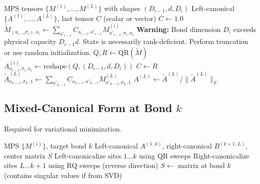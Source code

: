 \documentclass[aps,prb,onecolumn,scriptaddress]{revtex4-2}
\begin{document}
	\begin{algorithm}[H]
		\caption{LeftCanonicalize (Numerically Stable)}
		\begin{algorithmic}[1]
			\Require MPS tensors $\{M^{(1)}, \dots, M^{(L)}\}$ with shapes $(D_{i-1}, d, D_i)$
			\Ensure Left-canonical $\{A^{(1)}, \dots, A^{(L)}\}$, last tensor $C$ (scalar or vector)
			\State $C \gets 1.0$ 
			\State {}
			\State $\tilde{M}_{(a_{i-1}\sigma_i), a_i} \gets \sum_{a'_{i-1}} C_{a_{i-1}, a'_{i-1}} M^{(i)}_{a'_{i-1}, \sigma_i, a_i}$ 
			\State {}
			\State {}
			\State {}
			\State \textbf{Warning:} Bond dimension $D_i$ exceeds physical capacity $D_{i-1}d$. 
			\State {} State is necessarily rank-deficient. Perform truncation or use random initialization.
			\EndIf
			\State $Q, R \gets \text{QR}(\tilde{M})$ 
			\State $A^{(i)}_{a_{i-1}, \sigma_i, a_i} \gets \text{reshape}(Q, (D_{i-1}, d, D_i))$
			\State $C \gets R$ 
			\EndFor
			\State {}
			\State $\tilde{A}^{(L)}_{a_{L-1}, \sigma_L, 1} \gets \sum_{a'_{L-1}} C_{a_{L-1}, a'_{L-1}} M^{(L)}_{a'_{L-1}, \sigma_L, 1}$ 
			\State $A^{(L)} \gets \tilde{A}^{(L)} / \|\tilde{A}^{(L)}\|_F$ 
		\end{algorithmic}
	\end{algorithm}
	
	
	\subsection{Mixed-Canonical Form at Bond $k$}
	Required for variational minimization.
	
	\begin{algorithm}[H]
		\caption{BringToBond\\
			\textit{Numerical Note:} RQ decomposition (used for right-canonicalization) is less stable than QR and may not be available in all libraries (e.g., PyTorch). Alternative: Reverse the site order, apply \textsc{LeftCanonicalize}, then reverse back.}
		\begin{algorithmic}[1]
			\Require MPS $\{M^{(i)}\}$, target bond $k$
			\Ensure Left-canonical $A^{(1..k)}$, right-canonical $B^{(k+1..L)}$, center matrix $S$
			\State Left-canonicalize sites $1 \dots k$ using QR sweeps
			\State Right-canonicalize sites $L \dots k+1$ using RQ sweeps (reverse direction)
			\State $S \gets$ matrix at bond $k$ (contains singular values if from SVD)
		\end{algorithmic}
	\end{algorithm}
	
\end{document}
